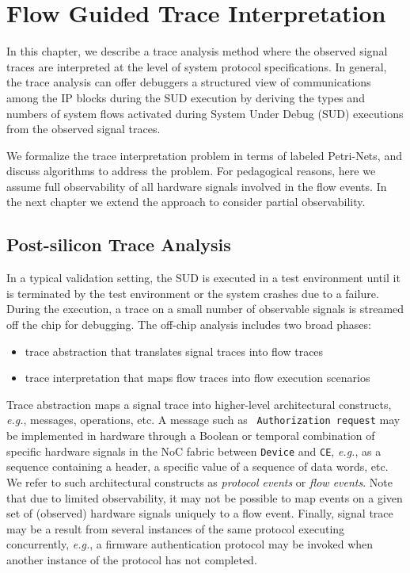 \documentclass[12pt,frontmatter,copyright,thesis]{usfmanus}
\newcommand{\eg}{\mbox{{\em e.g.}}}
\begin{document}
 

\chapter{Flow Guided Trace Interpretation}

 In this chapter,
 we describe a trace analysis method where the observed
 signal traces are interpreted at the level of system
 protocol specifications. In general, the trace analysis can offer
 debuggers a structured view of communications among the
 IP blocks during the SUD execution by deriving the types
 and numbers of system flows activated during System Under Debug (SUD)
 executions from the observed signal traces.

We formalize the trace interpretation problem in terms of labeled Petri-Nets,
 and discuss algorithms to address the problem.
  For pedagogical reasons, here we assume full
   observability of all hardware signals involved in the flow events. 
  In the next chapter we extend the approach
   to consider partial observability.





\section{Post-silicon Trace Analysis}
 In a typical validation setting, the SUD is executed in a test environment until it is
 terminated by the test environment or the system crashes
 due to a failure.  During the execution, a trace on a
 small number of observable signals is streamed off the
 chip for debugging.  
The off-chip analysis
includes two broad phases:
\begin{itemize} 
\item trace abstraction that translates signal traces into flow traces
\item trace interpretation that maps flow traces into flow execution scenarios
\end{itemize}
Trace abstraction maps
a signal trace into higher-level architectural constructs,
\eg, messages, operations, etc. A message such as {\tt
  Authorization request} may be implemented in hardware
through a Boolean or temporal combination of specific
hardware signals in the NoC fabric between {\tt Device} and
{\tt CE}, \eg, as a sequence containing a header, a specific
value of a sequence of data words, etc.  We refer to
such architectural constructs as {\em protocol events} or
{\em flow events}.  Note that due to limited observability,
it may not be possible to map events on a given set of (observed)
hardware signals uniquely to a flow event.  Finally,
signal trace may be a result from several instances of the same
protocol executing concurrently, \eg, a firmware
authentication protocol may be invoked when another instance
of the protocol has not completed.
\end{document}
